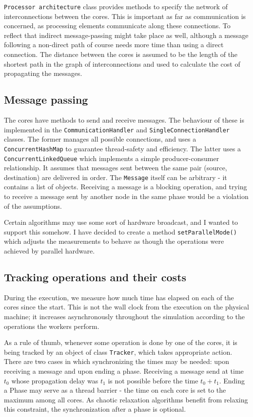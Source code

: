 \documentclass[12pt,a4paper,oneside,openright]{report}
\begin{document}
\texttt{Processor architecture} class provides methods to specify the network of interconnections between the cores. This is important as far as communication is concerned, as processing elements communicate along these connections. To reflect that indirect message-passing might take place as well, although a message following a non-direct path of course needs more time than using a direct connection. The distance between the cores is assumed to be the length of the shortest path in the graph of interconnections and used to calculate the cost of propagating the messages.

\subsection{Message passing}
The cores have methods to send and receive messages. The behaviour of these is implemented in the \texttt{CommunicationHandler} and \texttt{SingleConnectionHandler} classes. The former manages all possible connections, and uses a \texttt{ConcurrentHashMap} to guarantee thread-safety and efficiency. The latter uses a \texttt{ConcurrentLinkedQueue} which implements a simple producer-consumer relationship. It assumes that messages sent between the same pair (source, destination) are delivered in order. The \texttt{Message} itself can be arbitrary - it contains a list of objects. Receiving a message is a blocking operation, and trying to receive a message sent by another node in the same phase would be a violation of the assumptions.

Certain algorithms may use some sort of hardware broadcast, and I wanted to support this somehow. I have decided to create a method \texttt{setParallelMode()} which adjusts the measurements to behave as though the operations were achieved by parallel hardware.

\subsection{Tracking operations and their costs}
During the execution, we measure how much time has elapsed on each of the cores since the start. This is not the wall clock from the execution on the physical machine; it increases asynchronously throughout the simulation according to the operations the workers perform.

As a rule of thumb, whenever some operation is done by one of the cores, it is being tracked by an object of class \texttt{Tracker}, which takes appropriate action. There are two cases in which synchronizing the times may be needed: upon receiving a message and upon ending a phase. Receiving a message send at time $t_0$ whose propagation delay was $t_1$ is not possible before the time $t_0+t_1$. Ending a Phase may serve as a thread barrier - the time on each core is set to the maximum among all cores. As chaotic relaxation algorithms benefit from relaxing this constraint, the synchronization after a phase is optional.
\end{document}
